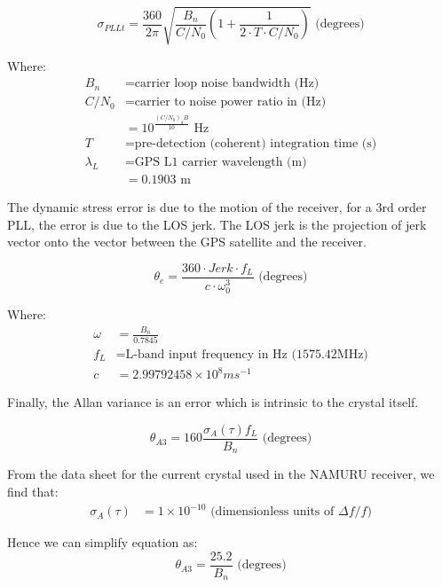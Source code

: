 \begin{equation}
\sigma_{PLLt} = \frac{360}{2 \pi} \sqrt{\frac{B_n}{C/N_0}(1+\frac{1}{2 \cdot T \cdot C/N_0})} \text{ (degrees)}
\end{equation}

Where:
\begin{align*}
B_n &= \text{carrier loop noise bandwidth (Hz)} \\
C/N_0 &= \text{carrier to noise power ratio in (Hz)} \\
&=10^\frac{(C/N_0)_dB}{10} \text{ Hz}\\
T &= \text{pre-detection (coherent) integration time (s)} \\
\lambda_L &= \text{GPS L1 carrier wavelength (m)}\\
&= 0.1903 \text{ m}
\end{align*}



The dynamic stress error is due to the motion of the receiver, for a 3rd order PLL, the error is due to the \ac{LOS} jerk. The \ac{LOS} jerk is the projection of jerk vector onto the vector between the \ac{GPS} satellite and the receiver.  

\begin{equation}
\theta_e = \frac{360 \cdot Jerk  \cdot f_L}{c  \cdot \omega^3_0} \text{ (degrees)}
\end{equation}


Where:
\begin{align*}
\omega &= \frac{B_n}{0.7845} \\
f_L &= \text{L-band input frequency in Hz (1575.42MHz)}\\ 
c & = 2.99792458 \times 10^8 ms^{-1}
\end{align*}


Finally, the Allan variance is an error which is intrinsic to the crystal itself. 

\begin{equation}
\label{eq:AllanVariance}
\theta_{A3} = 160 \frac{\sigma_A(\tau)f_L}{B_n} \text{ (degrees)}
\end{equation}

From the data sheet for the current crystal used in the \ac{NAMURU} receiver\cite{VT803Datasheet}, we find that: 
\begin{align*}
\sigma_A(\tau) &= 1 \times 10^{-10} \text{ (dimensionless units of }\Delta f/f\text{)}
\end{align*}

Hence we can simplify equation \label{eq:AllanVariance} as:
\begin{equation}
\theta_{A3} =\frac{25.2}{B_n} \text{ (degrees)}
\end{equation}


